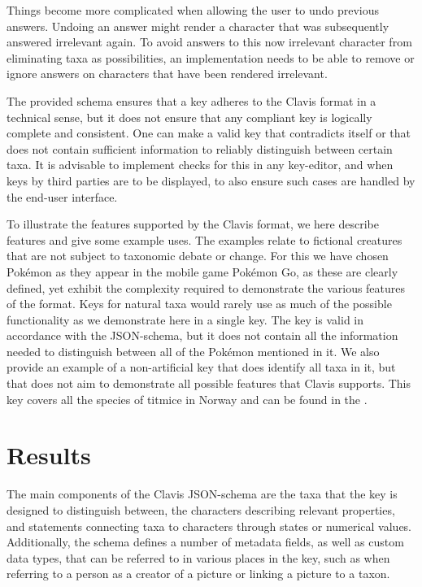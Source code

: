 \documentclass[10pt,letterpaper]{article}
\begin{document}
Things become more complicated when allowing the user to undo previous answers. Undoing an answer might render a character that was subsequently answered irrelevant again. To avoid answers to this now irrelevant character from eliminating taxa as possibilities, an implementation needs to be able to remove or ignore answers on characters that have been rendered irrelevant.

The provided schema ensures that a key adheres to the Clavis format in a technical sense, but it does not ensure that any compliant key is logically complete and consistent. One can make a valid key that contradicts itself or that does not contain sufficient information to reliably distinguish between certain taxa. It is advisable to implement checks for this in any key-editor, and when keys by third parties are to be displayed, to also ensure such cases are handled by the end-user interface.

To illustrate the features supported by the Clavis format, we here describe features and give some example uses. The examples relate to fictional creatures that are not subject to taxonomic debate or change. For this we have chosen Pokémon as they appear in the mobile game Pokémon Go, as these are clearly defined, yet exhibit the complexity required to demonstrate the various features of the format. Keys for natural taxa would rarely use as much of the possible functionality as we demonstrate here in a single key. The key is valid in accordance with the JSON-schema, but it does not contain all the information needed to distinguish between all of the Pokémon mentioned in it. We also provide an example of a non-artificial key that does identify all taxa in it, but that does not aim to demonstrate all possible features that Clavis supports. This key covers all the species of titmice in Norway and can be found in the .

\section*{
Results
}
The main components of the Clavis JSON-schema are the taxa that the key is designed to distinguish between, the characters describing relevant properties, and statements connecting taxa to characters through states or numerical values. Additionally, the schema defines a number of metadata fields, as well as custom data types, that can be referred to in various places in the key, such as when referring to a person as a creator of a picture or linking a picture to a taxon.
\end{document}
